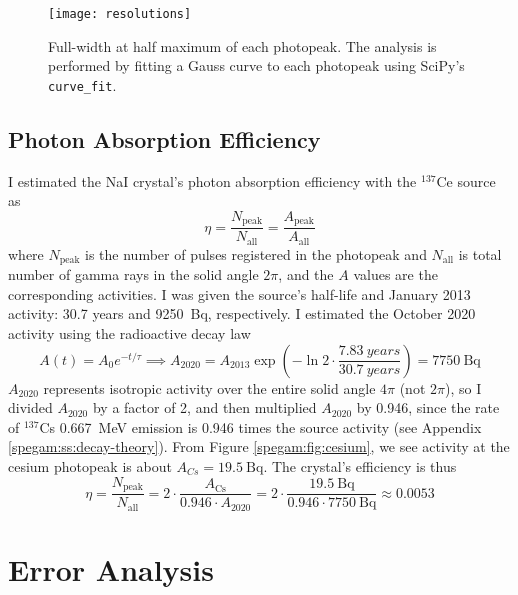 \documentclass[11pt, a4paper]{article}
\newcommand{\isoptope}[2]{${}^{#2}${#1}}
\begin{document}
\begin{figure}
	\centering
	\texttt{[image: resolutions]}
	\caption{Full-width at half maximum of each photopeak. The analysis is performed by fitting a Gauss curve to each photopeak using SciPy's \texttt{curve\_fit}.}
	\label{spegam:fig:resolutions}
\end{figure}

\subsection{Photon Absorption Efficiency}
I estimated the NaI crystal's photon absorption efficiency with the \isoptope{Ce}{137} source as
\begin{equation*}
	\eta = \frac{N_{\text{peak}}}{N_{\text{all}}} = \frac{A_{\text{peak}}}{A_{\text{all}}}
\end{equation*}
where $ N_{\text{peak}} $ is the number of pulses registered in the photopeak and $ N_{\text{all}} $ is total number of gamma rays in the solid angle $ 2\pi $, and the $ A $ values are the corresponding activities. I was given the source's half-life and January 2013 activity: 30.7 years and \SI{9250}{\becquerel}, respectively. I estimated the October 2020 activity using the radioactive decay law
\begin{equation*}
	A(t) = A_{0}e^{-t/\tau}  \implies  A_{\text{2020}} = A_{\text{2013}}\exp(-\ln 2 \cdot \frac{\SI{7.83}{years}}{\SI{30.7}{years}} ) = \SI{7750}{\becquerel}
\end{equation*}
$ A_{\text{2020}} $ represents isotropic activity over the entire solid angle $ 4\pi $ (not $ 2\pi $), so I divided $ A_{\text{2020}} $ by a factor of 2, and then multiplied $ A_{\text{2020}} $ by 0.946, since the rate of \isoptope{Cs}{137} \SI{0.667}{\mega \electronvolt} emission is 0.946 times the source activity (see Appendix \ref{spegam:ss:decay-theory}). From Figure \ref{spegam:fig:cesium}, we see activity at the cesium photopeak is about $ A_{Cs} = \SI{19.5}{\becquerel}$. The crystal's efficiency is thus
\begin{equation*}
	\eta = \frac{N_{\text{peak}}}{N_{\text{all}}} = 2\cdot \frac{A_{\text{Cs}}}{0.946 \cdot A_{\text{2020}}} = 2\cdot \frac{\SI{19.5}{\becquerel}}{0.946 \cdot \SI{7750}{\becquerel}} \approx 0.0053
\end{equation*}

\section{Error Analysis}
\end{document}
